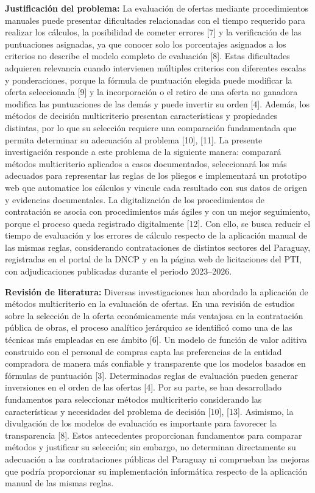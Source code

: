 \documentclass[12pt,a4paper]{article}
\begin{document}
\textbf{Justificación del problema:} La evaluación de ofertas mediante procedimientos manuales puede presentar dificultades relacionadas con el tiempo requerido para realizar los cálculos, la posibilidad de cometer errores [7] y la verificación de las puntuaciones asignadas, ya que conocer solo los porcentajes asignados a los criterios no describe el modelo completo de evaluación [8]. Estas dificultades adquieren relevancia cuando intervienen múltiples criterios con diferentes escalas y ponderaciones, porque la fórmula de puntuación elegida puede modificar la oferta seleccionada [9] y la incorporación o el retiro de una oferta no ganadora modifica las puntuaciones de las demás y puede invertir su orden [4]. Además, los métodos de decisión multicriterio presentan características y propiedades distintas, por lo que su selección requiere una comparación fundamentada que permita determinar su adecuación al problema [10], [11]. La presente investigación responde a este problema de la siguiente manera: comparará métodos multicriterio aplicados a casos documentados, seleccionará los más adecuados para representar las reglas de los pliegos e implementará un prototipo web que automatice los cálculos y vincule cada resultado con sus datos de origen y evidencias documentales. La digitalización de los procedimientos de contratación se asocia con procedimientos más ágiles y con un mejor seguimiento, porque el proceso queda registrado digitalmente [12]. Con ello, se busca reducir el tiempo de evaluación y los errores de cálculo respecto de la aplicación manual de las mismas reglas, considerando contrataciones de distintos sectores del Paraguay, registradas en el portal de la DNCP y en la página web de licitaciones del PTI, con adjudicaciones publicadas durante el periodo 2023–2026.

\textbf{Revisión de literatura:} Diversas investigaciones han abordado la aplicación de métodos multicriterio en la evaluación de ofertas. En una revisión de estudios sobre la selección de la oferta económicamente más ventajosa en la contratación pública de obras, el proceso analítico jerárquico se identificó como una de las técnicas más empleadas en ese ámbito [6]. Un modelo de función de valor aditiva construido con el personal de compras capta las preferencias de la entidad compradora de manera más confiable y transparente que los modelos basados en fórmulas de puntuación [3]. Determinadas reglas de evaluación pueden generar inversiones en el orden de las ofertas [4]. Por su parte, se han desarrollado fundamentos para seleccionar métodos multicriterio considerando las características y necesidades del problema de decisión [10], [13]. Asimismo, la divulgación de los modelos de evaluación es importante para favorecer la transparencia [8]. Estos antecedentes proporcionan fundamentos para comparar métodos y justificar su selección; sin embargo, no determinan directamente su adecuación a las contrataciones públicas del Paraguay ni comprueban las mejoras que podría proporcionar su implementación informática respecto de la aplicación manual de las mismas reglas.
\end{document}
